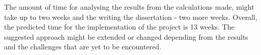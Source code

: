 The amount of time for analysing the results from the calculations made, might take up to two weeks and the writing the dissertation - two more weeks. Overall, the predicted time for the implementation of the project is 13 weeks. The suggested approach might be extended or changed depending from the results and the challenges that are yet to be encountered.
